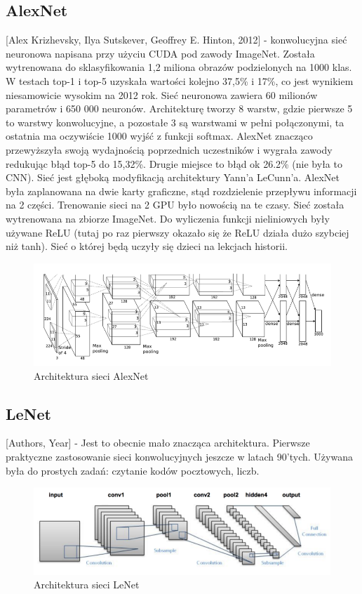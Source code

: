 \documentclass[a4paper,twoside,titlepage,openright]{book}
\begin{document}
\subsection{AlexNet}
 [Alex Krizhevsky, Ilya Sutskever, Geoffrey E. Hinton, 2012] - konwolucyjna sieć neuronowa napisana przy użyciu CUDA pod zawody ImageNet. Została wytrenowana do sklasyfikowania 1,2 miliona obrazów podzielonych na 1000 klas. W testach top-1 i top-5 uzyskała wartości kolejno 37,5\% i 17\%, co jest wynikiem niesamowicie wysokim na 2012 rok. Sieć neuronowa zawiera 60 milionów parametrów i 650 000 neuronów. Architekturę tworzy 8 warstw, gdzie pierwsze 5 to warstwy konwolucyjne, a pozostałe 3 są warstwami w pełni połączonymi, ta ostatnia ma oczywiście 1000 wyjść z funkcji softmax. AlexNet znacząco przewyższyła swoją wydajnością poprzednich uczestników i wygrała zawody redukując błąd top-5 do 15,32\%. Drugie miejsce to błąd ok 26.2\% (nie była to CNN). Sieć jest głęboką modyfikacją architektury Yann’a LeCunn’a. AlexNet była zaplanowana na dwie karty graficzne, stąd rozdzielenie przepływu informacji na 2 części. Trenowanie sieci na 2 GPU było nowością na te czasy. Sieć została wytrenowana na zbiorze ImageNet. Do wyliczenia funkcji nieliniowych były używane ReLU (tutaj po raz pierwszy okazało się że ReLU działa dużo szybciej niż tanh). Sieć o której będą uczyły się dzieci na lekcjach historii.
\begin{figure}[h]
	\centering
			\includegraphics[resolution=120]{AlexNet.png}
		\caption{Architektura sieci AlexNet}
\end{figure}

\subsection{LeNet}
[Authors, Year] - Jest to obecnie mało znacząca architektura. Pierwsze praktyczne zastosowanie sieci konwolucyjnych jeszcze w latach 90’tych. Używana była do prostych zadań: czytanie kodów pocztowych, liczb.
\begin{figure}[h]
	\centering
			\includegraphics[resolution=120]{LeNet.png}
		\caption{Architektura sieci LeNet}
\end{figure}
\end{document}
